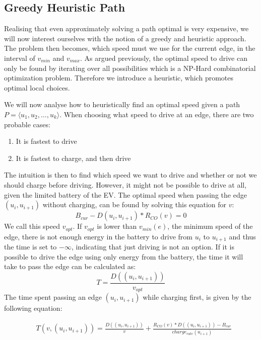 \subsection{Greedy Heuristic Path}\label{sec:greedy}
Realising that even approximately solving a path optimal is very expensive, we will now interest ourselves with the notion of a greedy and heuristic approach. The problem then becomes, which speed must we use for the current edge, in the interval of $v_{min}$ and $v_{max}$. As argued previously, the optimal speed to drive can only be found by iterating over all possibilities which is a NP-Hard combinatorial optimization problem. Therefore we introduce a heuristic, which promotes optimal local choices. 

We will now analyse how to heuristically find an optimal speed given a path $P = \langle u_1,u_2,\dots,u_k \rangle$. When choosing what speed to drive at an edge, there are two probable cases:
\begin{enumerate}
	\item It is fastest to drive
	\item It is fastest to charge, and then drive
\end{enumerate}

The intuition is then to find which speed we want to drive and whether or not we should charge before driving. However, it might not be possible to drive at all, given the limited battery of the EV. The optimal speed when passing the edge $(u_i, u_{i+1})$ without charging, can be found by solving this equation for $v$:
\[B_{cur} - D(u_i, u_{i+1}) * R_{CO}(v) = 0\] 
We call this speed $v_{opt}$. If $v_{opt}$ is lower than $v_{min}(e)$, the minimum speed of the edge, there is not enough energy in the battery to drive from $u_i$ to $u_{i+1}$ and thus the time is set to $-\infty$, indicating that just driving is not an option. If it is possible to drive the edge using only energy from the battery, the time it will take to pass the edge can be calculated as:
 \[T = \frac{D((u_i, u_{i+1}))}{v_{opt}} \] 
The time spent passing an edge $(u_i, u_{i+1})$ while charging first, is given by the following equation:

\begin{equation*}
\begin{aligned}
 & T(v,(u_i, u_{i+1})) = \frac{D((u_i, u_{i+1}))}{v} + \frac{R_{CO}(v) * D((u_i, u_{i+1})) - B_{cur}}{charge_{rate}(u_{i+1})}
\end{aligned}
\end{equation*}\label{eq:drivingAndCharging}

